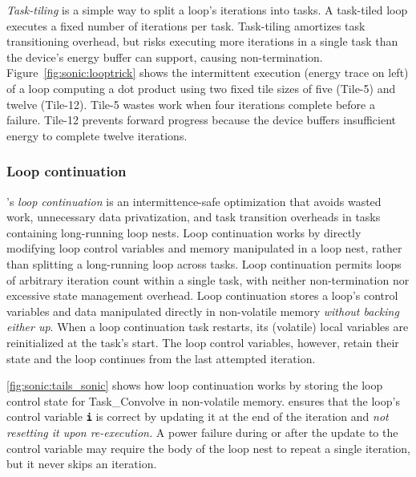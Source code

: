 \figSONICCompDesigns

{\em Task-tiling} is a simple way to split a loop's iterations into tasks.  A
task-tiled loop executes a fixed number of iterations per task.  Task-tiling
amortizes task transitioning overhead, but risks executing more iterations in a
single task than the device's energy buffer can support, causing
non-termination.  Figure~\ref{fig:sonic:looptrick} shows the intermittent execution
(energy trace on left) of a loop computing a dot product using two
fixed tile sizes of five (Tile-5) and twelve (Tile-12). Tile-5 wastes work when four
iterations complete before a failure.  Tile-12 prevents forward
progress because the device buffers insufficient energy to complete twelve
iterations.

\subsubsection{Loop continuation}

\sonic's \emph{loop continuation} is an intermittence-safe optimization that avoids wasted work,
unnecessary data privatization, and task transition overheads in tasks
containing long-running loop nests. Loop continuation works by directly
modifying loop control variables and memory manipulated in a loop nest, rather
than splitting a long-running loop across tasks. 
%
Loop continuation
permits loops of arbitrary iteration count within a single task, with neither
non-termination nor excessive state management overhead.
%
Loop continuation stores a loop's control variables and data manipulated directly in non-volatile
memory \emph{without backing either up}.  When a loop continuation task restarts, its
(volatile) local variables are reinitialized at the task's start.  The loop
control variables, however, retain their state and the loop continues from the
last attempted iteration.

\figSONICLoopContinuation

\autoref{fig:sonic:tails_sonic} shows how loop continuation
works by storing the loop control state for \textsf{Task\_Convolve} in non-volatile memory.  
%
\sonic ensures that the loop's control variable {\tt\bfseries i} is correct by updating it at the end of the iteration and \emph{not resetting it upon re-execution.}
A power failure during or after the update to
the control variable may require the body of the loop nest to repeat a single
iteration, but %
it never skips an iteration.

